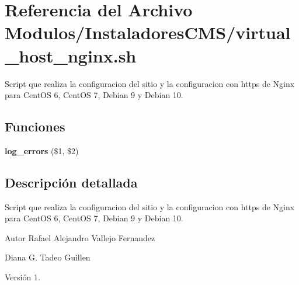 \hypertarget{virtual__host__nginx_8sh}{}\section{Referencia del Archivo Modulos/\+Instaladores\+C\+M\+S/virtual\+\_\+host\+\_\+nginx.sh}
\label{virtual__host__nginx_8sh}


Script que realiza la configuracion del sitio y la configuracion con https de Nginx para Cent\+OS 6, Cent\+OS 7, Debian 9 y Debian 10.  


\subsection*{Funciones}
\begin{DoxyCompactItemize}
\item 
\mbox{\label{virtual__host__nginx_8sh_a92067b58a8478c9841b2cd9b75ea3565}} 
{\bfseries log\+\_\+errors} (\$1, \$2)
\end{DoxyCompactItemize}


\subsection{Descripción detallada}
Script que realiza la configuracion del sitio y la configuracion con https de Nginx para Cent\+OS 6, Cent\+OS 7, Debian 9 y Debian 10. 

\begin{DoxyAuthor}{Autor}
Rafael Alejandro Vallejo Fernandez 

Diana G. Tadeo Guillen 
\end{DoxyAuthor}
\begin{DoxyVersion}{Versión}
1. 
\end{DoxyVersion}
